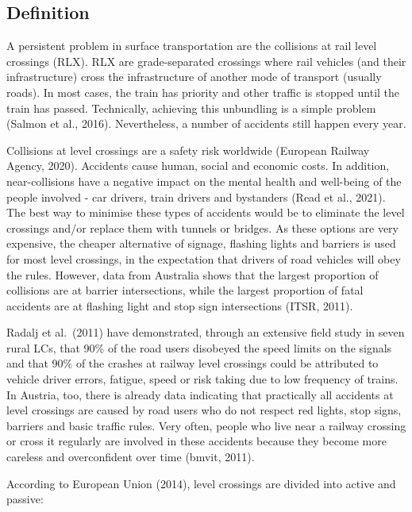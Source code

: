 \documentclass[
]{book}
\begin{document}
\hypertarget{definition-1}{%
\subsection*{Definition}\label{definition-1}}

A persistent problem in surface transportation are the collisions at rail level crossings (RLX). RLX are grade-separated crossings where rail vehicles (and their infrastructure) cross the infrastructure of another mode of transport (usually roads). In most cases, the train has priority and other traffic is stopped until the train has passed. Technically, achieving this unbundling is a simple problem (Salmon et al., 2016). Nevertheless, a number of accidents still happen every year.

Collisions at level crossings are a safety risk worldwide (European Railway Agency, 2020). Accidents cause human, social and economic costs. In addition, near-collisions have a negative impact on the mental health and well-being of the people involved - car drivers, train drivers and bystanders (Read et al., 2021). The best way to minimise these types of accidents would be to eliminate the level crossings and/or replace them with tunnels or bridges. As these options are very expensive, the cheaper alternative of signage, flashing lights and barriers is used for most level crossings, in the expectation that drivers of road vehicles will obey the rules. However, data from Australia shows that the largest proportion of collisions are at barrier intersections, while the largest proportion of fatal accidents are at flashing light and stop sign intersections (ITSR, 2011).

Radalj et al.~(2011) have demonstrated, through an extensive field study in seven rural LCs, that 90\% of the road users disobeyed the speed limits on the signals and that 90\% of the crashes at railway level crossings could be attributed to vehicle driver errors, fatigue, speed or risk taking due to low frequency of trains. In Austria, too, there is already data indicating that practically all accidents at level crossings are caused by road users who do not respect red lights, stop signs, barriers and basic traffic rules. Very often, people who live near a railway crossing or cross it regularly are involved in these accidents because they become more careless and overconfident over time (bmvit, 2011).

According to European Union (2014), level crossings are divided into active and passive:
\end{document}
